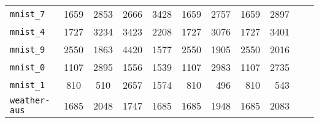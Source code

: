 \begin{tabular}{lccrrrrrrrr}
\texttt{mnist\_7} & 1659 & 2853 & 2666 & 3428 & 1659 & 2757 & 1659 & 2897\\
\texttt{mnist\_4} & 1727 & 3234 & 3423 & 2208 & 1727 & 3076 & 1727 & 3401\\
\texttt{mnist\_9} & 2550 & 1863 & 4420 & 1577 & 2550 & 1905 & 2550 & 2016\\
\texttt{mnist\_0} & 1107 & 2895 & 1556 & 1539 & 1107 & 2983 & 1107 & 2735\\
\texttt{mnist\_1} & 810 & 510 & 2657 & 1574 & 810 & 496 & 810 & 543\\
\texttt{weather-aus} & 1685 & 2048 & 1747 & 1685 & 1685 & 1948 & 1685 & 2083\\
\bottomrule
\end{tabular}
